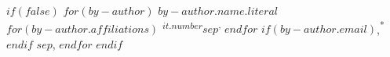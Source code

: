 $if(false)$%
$for(by-author)$%
{$by-author.name.literal$}%
$for(by-author.affiliations)$%
{\textsuperscript{$it.number$}}$sep${\textsuperscript{,}}%
$endfor$%
$if(by-author.email)$,{\textsuperscript{*}}%
$endif$%
$sep$, %
$endfor$%
$endif$